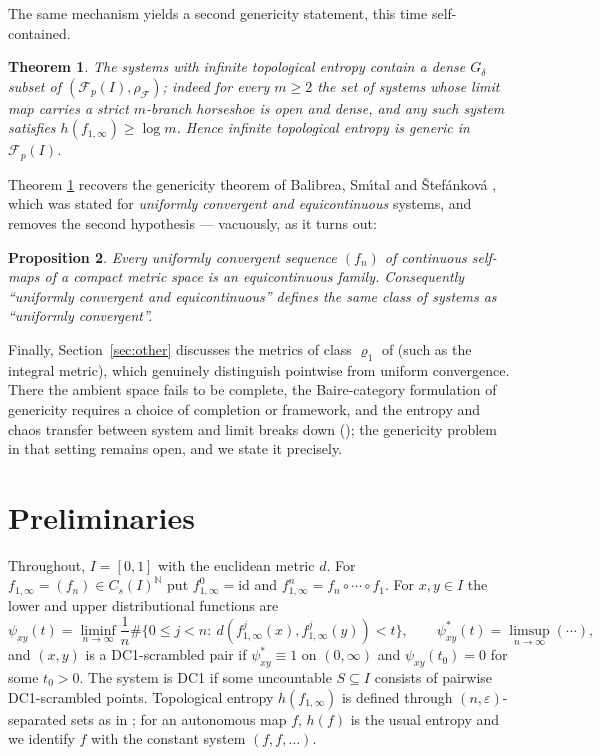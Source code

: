 \documentclass[11pt]{article}
\newtheorem{theorem}{Theorem}[section]
\newtheorem{proposition}[theorem]{Proposition}
\newcommand{\I}{I}
\newcommand{\Cs}{C_s(\I)}
\newcommand{\Fp}{\mathcal F_p(\I)}
\newcommand{\rF}{\rho_{\mathcal F}}
\begin{document}
The same mechanism yields a second genericity statement, this time self-contained.

\begin{theorem}\label{thm:entropy}
The systems with infinite topological entropy contain a dense $G_\delta$ subset of
$(\Fp,\rF)$; indeed for every $m\ge2$ the set of systems whose limit map carries a
strict $m$-branch horseshoe is open and dense, and any such system satisfies
$h(f_{1,\infty})\ge\log m$.  Hence infinite topological entropy is generic in
$\Fp$.
\end{theorem}

Theorem \ref{thm:entropy} recovers the genericity theorem of Balibrea,
Sm\'\i tal and \v Stef\'ankov\'a \cite[Theorem A-type result]{BSS}, which was
stated for \emph{uniformly convergent and equicontinuous} systems, and removes the
second hypothesis --- vacuously, as it turns out:

\begin{proposition}\label{prop:equi}
Every uniformly convergent sequence $(f_n)$ of continuous self-maps of a compact
metric space is an equicontinuous family.  Consequently ``uniformly convergent and
equicontinuous'' defines the same class of systems as ``uniformly convergent''.
\end{proposition}

Finally, Section~\ref{sec:other} discusses the metrics of class $\varrho_1$ of
\cite{BR} (such as the integral metric), which genuinely distinguish pointwise from
uniform convergence.  There the ambient space fails to be complete, the
Baire-category formulation of genericity requires a choice of completion or
framework, and the entropy and chaos transfer between system and limit breaks down
(\cite[Section 3]{BR}); the genericity problem in that setting remains open, and we
state it precisely.

\section{Preliminaries}\label{sec:prelim}

Throughout, $\I=[0,1]$ with the euclidean metric $d$.  For
$f_{1,\infty}=(f_n)\in\Cs^{\mathbb N}$ put $f^0_{1,\infty}=\mathrm{id}$ and
$f^n_{1,\infty}=f_n\circ\cdots\circ f_1$.  For $x,y\in\I$ the lower and upper
distributional functions are
\[
\psi_{xy}(t)=\liminf_{n\to\infty}\frac1n\#\bigl\{0\le j<n:\
d(f^j_{1,\infty}(x),f^j_{1,\infty}(y))<t\bigr\},
\qquad
\psi^*_{xy}(t)=\limsup_{n\to\infty}(\cdots),
\]
and $(x,y)$ is a DC1-scrambled pair if $\psi^*_{xy}\equiv1$ on $(0,\infty)$ and
$\psi_{xy}(t_0)=0$ for some $t_0>0$.  The system is DC1 if some uncountable
$S\subseteq\I$ consists of pairwise DC1-scrambled points.  Topological entropy
$h(f_{1,\infty})$ is defined through $(n,\varepsilon)$-separated sets as in
\cite{KS,BR}; for an autonomous map $f$, $h(f)$ is the usual entropy and we identify
$f$ with the constant system $(f,f,\dots)$.
\end{document}
